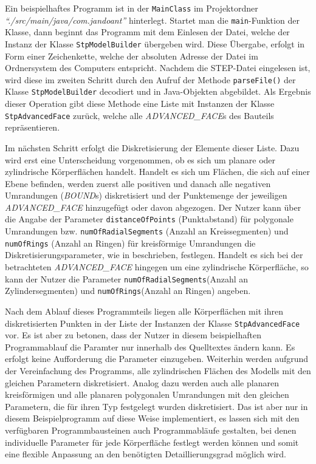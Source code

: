 Ein beispielhaftes Programm ist in der \verb|MainClass| im Projektordner \textit{"`./src/\-main/\-java/\-com.jandoant"'} hinterlegt. Startet man die \verb|main|-Funktion der Klasse, dann beginnt das Programm mit dem Einlesen der Datei, welche der Instanz der Klasse \verb|StpModelBuilder| übergeben wird. Diese Übergabe, erfolgt in Form einer Zeichenkette, welche der absoluten Adresse der Datei im Ordnersystem des Computers entspricht.
Nachdem die STEP-Datei eingelesen ist, wird diese im zweiten Schritt durch den Aufruf der Methode \verb|parseFile()| der Klasse \verb|StpModelBuilder| decodiert und in Java-Objekten abgebildet. Als Ergebnis dieser Operation gibt diese Methode eine Liste mit Instanzen der Klasse \verb|StpAdvancedFace| zurück, welche alle \textit{ADVANCED\_FACE}s des Bauteils repräsentieren.

Im nächsten Schritt erfolgt die Diskretisierung der Elemente dieser Liste. 
Dazu wird erst eine Unterscheidung vorgenommen, ob es sich um planare oder zylindrische Körperflächen handelt. 
Handelt es sich um Flächen, die sich auf einer Ebene befinden, werden zuerst alle positiven und danach alle negativen Umrandungen (\textit{BOUND}s) diskretisiert und der Punktemenge der jeweiligen \textit{ADVANCED\_FACE} hinzugefügt oder davon abgezogen. Der Nutzer kann über die Angabe der Parameter \verb|distanceOfPoints| (Punktabstand) für polygonale Umrandungen bzw. \verb|numOfRadialSegments| (Anzahl an Kreissegmenten) und \verb|numOfRings| (Anzahl an Ringen) für kreisförmige Umrandungen die Diskretisierungsparameter, wie in  beschrieben, festlegen.
Handelt es sich bei der betrachteten \textit{ADVANCED\_FACE} hingegen um eine zylindrische Körperfläche, so kann der Nutzer die Parameter \verb|numOfRadialSegments|(Anzahl an Zylindersegmenten) und \verb|numOfRings|(Anzahl an Ringen) angeben. 

Nach dem Ablauf dieses Programmteils liegen alle Körperflächen mit ihren diskretisierten Punkten in der Liste der Instanzen der Klasse \verb|StpAdvancedFace| vor. 
Es ist aber zu betonen, dass der Nutzer in diesem beispielhaften Programmablauf die Paramter nur innerhalb des Quelltextes ändern kann. Es erfolgt keine Aufforderung die Parameter einzugeben.
Weiterhin werden aufgrund der Vereinfachung des Programms, alle zylindrischen Flächen des Modells mit den gleichen Parametern diskretisiert. Analog dazu werden auch alle planaren kreisförmigen und alle planaren polygonalen Umrandungen mit den gleichen Parametern, die für ihren Typ festgelegt wurden diskretisiert. Das ist aber nur in diesem Beispielprogramm  auf diese Weise implementiert, es lassen sich mit den verfügbaren Programmbausteinen auch Programmabläufe gestalten, bei denen individuelle Parameter für jede Körperfläche festlegt werden können und somit eine flexible Anpassung an den benötigten Detaillierungsgrad möglich wird.          

